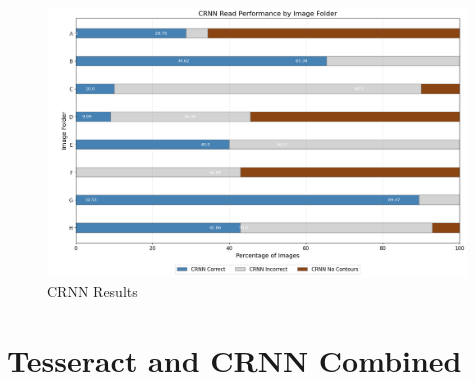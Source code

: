 \begin{figure}[ht]
    \centering
    \includegraphics[width=0.99\textwidth]{Figures/Results/crnn.png}
    \caption[CRNN Results]{CRNN Results}
    \label{fig:CRNN Results}
\end{figure}

\newpage

\section{Tesseract and CRNN Combined}

